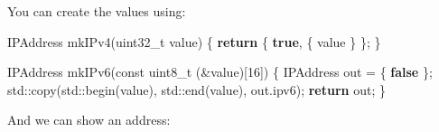 \documentclass[]{article}
\newenvironment{Shaded}{}{}
\newcommand{\AttributeTok}[1]{\textcolor[rgb]{0.49,0.56,0.16}{#1}}
\newcommand{\BuiltInTok}[1]{\textcolor[rgb]{0.00,0.50,0.00}{#1}}
\newcommand{\ControlFlowTok}[1]{\textcolor[rgb]{0.00,0.44,0.13}{\textbf{#1}}}
\newcommand{\DataTypeTok}[1]{\textcolor[rgb]{0.56,0.13,0.00}{#1}}
\newcommand{\DecValTok}[1]{\textcolor[rgb]{0.25,0.63,0.44}{#1}}
\newcommand{\KeywordTok}[1]{\textcolor[rgb]{0.00,0.44,0.13}{\textbf{#1}}}
\newcommand{\NormalTok}[1]{#1}
\newcommand{\OperatorTok}[1]{\textcolor[rgb]{0.40,0.40,0.40}{#1}}
\begin{document}
You can create the values using:

\begin{Shaded}
\begin{Highlighting}[]
\NormalTok{IPAddress mkIPv4}\OperatorTok{(}\DataTypeTok{uint32\_t}\NormalTok{ value}\OperatorTok{)} \OperatorTok{\{}
    \ControlFlowTok{return} \OperatorTok{\{} \KeywordTok{true}\OperatorTok{,} \OperatorTok{\{}\NormalTok{ value }\OperatorTok{\}} \OperatorTok{\};}
\OperatorTok{\}}

\NormalTok{IPAddress mkIPv6}\OperatorTok{(}\AttributeTok{const} \DataTypeTok{uint8\_t} \OperatorTok{(\&}\NormalTok{value}\OperatorTok{)[}\DecValTok{16}\OperatorTok{])} \OperatorTok{\{}
\NormalTok{    IPAddress out }\OperatorTok{=} \OperatorTok{\{} \KeywordTok{false} \OperatorTok{\};}
    \BuiltInTok{std::}\NormalTok{copy}\OperatorTok{(}\BuiltInTok{std::}\NormalTok{begin}\OperatorTok{(}\NormalTok{value}\OperatorTok{),} \BuiltInTok{std::}\NormalTok{end}\OperatorTok{(}\NormalTok{value}\OperatorTok{),}\NormalTok{ out}\OperatorTok{.}\NormalTok{ipv6}\OperatorTok{);}
    \ControlFlowTok{return}\NormalTok{ out}\OperatorTok{;}
\OperatorTok{\}}
\end{Highlighting}
\end{Shaded}

And we can show an address:
\end{document}
